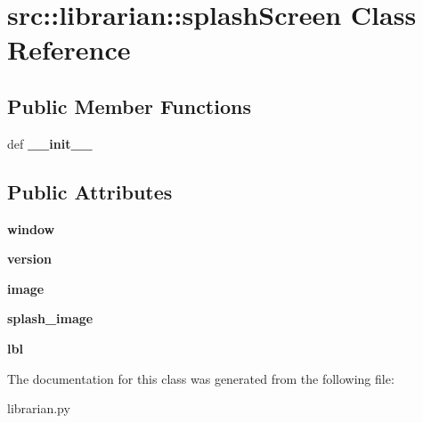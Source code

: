 \hypertarget{classsrc_1_1librarian_1_1splashScreen}{
\section{src::librarian::splashScreen Class Reference}
\label{classsrc_1_1librarian_1_1splashScreen}
}
\subsection*{Public Member Functions}
\begin{DoxyCompactItemize}
\item 
\hypertarget{classsrc_1_1librarian_1_1splashScreen_a0a5e0b84e89773d5afcf7d1da9624eea}{
def {\bfseries \_\-\_\-init\_\-\_\-}}
\label{classsrc_1_1librarian_1_1splashScreen_a0a5e0b84e89773d5afcf7d1da9624eea}

\end{DoxyCompactItemize}
\subsection*{Public Attributes}
\begin{DoxyCompactItemize}
\item 
\hypertarget{classsrc_1_1librarian_1_1splashScreen_ab5892e71b8ce48443ed3424f4cd5b36f}{
{\bfseries window}}
\label{classsrc_1_1librarian_1_1splashScreen_ab5892e71b8ce48443ed3424f4cd5b36f}

\item 
\hypertarget{classsrc_1_1librarian_1_1splashScreen_a55c3b32b6095eba1aaa1b5ab8cddbcbb}{
{\bfseries version}}
\label{classsrc_1_1librarian_1_1splashScreen_a55c3b32b6095eba1aaa1b5ab8cddbcbb}

\item 
\hypertarget{classsrc_1_1librarian_1_1splashScreen_a8bb572278b105d5e429f22d32905b104}{
{\bfseries image}}
\label{classsrc_1_1librarian_1_1splashScreen_a8bb572278b105d5e429f22d32905b104}

\item 
\hypertarget{classsrc_1_1librarian_1_1splashScreen_a5818c9796d5779cac4796f17217f3924}{
{\bfseries splash\_\-image}}
\label{classsrc_1_1librarian_1_1splashScreen_a5818c9796d5779cac4796f17217f3924}

\item 
\hypertarget{classsrc_1_1librarian_1_1splashScreen_a08041ee1f1ea818f945e39bd0cae206d}{
{\bfseries lbl}}
\label{classsrc_1_1librarian_1_1splashScreen_a08041ee1f1ea818f945e39bd0cae206d}

\end{DoxyCompactItemize}


The documentation for this class was generated from the following file:\begin{DoxyCompactItemize}
\item 
librarian.py\end{DoxyCompactItemize}
